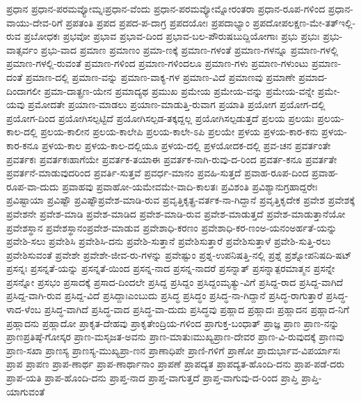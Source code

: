 {ಪ್ರಧಾನ
ಪ್ರಧಾನ-ಪರಮವ್ಯೋಮ್ನಃಪ್ರಧಾನ-ವೆಂದು
ಪ್ರಧಾನ-ಪರಮವ್ಯೋಮ್ನೋರಂತರಾ
ಪ್ರಧಾನ-ರೂಪ-ಗಳಿಂದ
ಪ್ರಧಾನ-ವಾಯು-ದೇವ-ರಿಗೆ
ಪ್ರಪತಂತಿ
ಪ್ರಪದ
ಪ್ರಪದ-ಪ-ದಾಗ್ರ
ಪ್ರಪದಯೋಃ
ಪ್ರಪದಾಭ್ಯಾಂ
ಪ್ರಪದೋಪಲಕ್ಷಣ-ಮೇ-ತತ್ಇಲ್ಲಿ-ರುವ
ಪ್ರಬೋಧಕಃ
ಪ್ರಭವೋ
ಪ್ರಭಾವ
ಪ್ರಭಾವ-ದಿಂದ
ಪ್ರಭಾವ-ಬಲ-ಪೌರುಷಬುದ್ದಿಯೋಗಾಃ
ಪ್ರಭು
ಪ್ರಭುಃ
ಪ್ರಭು-ವಾತ್ಸರ್ವಂ
ಪ್ರಭು-ವಾದ
ಪ್ರಮಾಣ
ಪ್ರಮಾಣಂ
ಪ್ರಮಾ-ಣಕ್ಕೆ
ಪ್ರಮಾಣ-ಗಳಂತೆ
ಪ್ರಮಾಣ-ಗಳನ್ನೂ
ಪ್ರಮಾಣ-ಗಳಲ್ಲಿ
ಪ್ರಮಾಣ-ಗಳಲ್ಲಿ-ರುವಂತೆ
ಪ್ರಮಾಣ-ಗಳಿಂದ
ಪ್ರಮಾಣ-ಗಳಿಂದಲೂ
ಪ್ರಮಾಣ-ಗಳು
ಪ್ರಮಾಣ-ಗಳುಂಟು
ಪ್ರಮಾಣ-ದಂತೆ
ಪ್ರಮಾಣ-ದಲ್ಲಿ
ಪ್ರಮಾಣ-ವನ್ನು
ಪ್ರಮಾಣ-ವಾಕ್ಯ-ಗಳ
ಪ್ರಮಾಣ-ವಿದೆ
ಪ್ರಮಾಣವು
ಪ್ರಮಾಣೇ
ಪ್ರಮಾದ-ದಿಂದಾಗಲೀ
ಪ್ರಮಾ-ದಾತ್ಪ್ರಣ-ಯೇನ
ಪ್ರಮಾದ್ಯಥ
ಪ್ರಮುಖ
ಪ್ರಮೇಯ
ಪ್ರಮೇಯ-ವನ್ನು
ಪ್ರಮೇಯ-ವನ್ನೇ
ಪ್ರಮೇ-ಯವು
ಪ್ರಮೋದತೇ
ಪ್ರಯಾಣ-ಮಾಡಲು
ಪ್ರಯಾಣ-ಮಾಡುತ್ತಿ-ರುವಾಗ
ಪ್ರಯಾತಿ
ಪ್ರಯೋಗ
ಪ್ರಯೋಗ-ದಲ್ಲಿ
ಪ್ರಯೋಗ-ದಿಂದ
ಪ್ರಯೋಗಿಸಲ್ಪಟ್ಟಿದೆ
ಪ್ರಯೋಗಿಸಲ್ಪಡ-ತಕ್ಕದ್ದಲ್ಲ
ಪ್ರಯೋಗಿಸಲ್ಪಡುತ್ತದೆ
ಪ್ರಲಯ
ಪ್ರಲಯಃ
ಪ್ರಲಯ-ಕಾಲ-ದಲ್ಲಿ
ಪ್ರಲಯ-ಕಾಲೀನ
ಪ್ರಲಯ-ಕಾಲೇಪಿ
ಪ್ರಲಯ-ಕಾಲೇ-ಽಪಿ
ಪ್ರಲಯೇ
ಪ್ರಳಯ
ಪ್ರಳಯ-ಕಾರ-ಕನು
ಪ್ರಳಯ-ಕಾರ-ಕನೂ
ಪ್ರಳಯ-ಕಾಲ
ಪ್ರಳಯ-ಕಾಲ-ದಲ್ಲಿಯೂ
ಪ್ರಳಯ-ದಲ್ಲಿ
ಪ್ರಳಯೋದಕ-ದಲ್ಲಿ
ಪ್ರವ-ಚನ
ಪ್ರವರ್ತಂತೇ
ಪ್ರವರ್ತಕಃ
ಪ್ರವರ್ತಕಃಹಾಗೆಯೇ
ಪ್ರವರ್ತಕ-ತಯಾಈ
ಪ್ರವರ್ತಕ-ನಾಗಿ-ರುವು-ದ-ರಿಂದ
ಪ್ರವರ್ತ-ಕನೂ
ಪ್ರವರ್ತತೇ
ಪ್ರವರ್ತನೆ-ಮಾಡುವುದರಿಂದ
ಪ್ರವರ್ತಿ-ಸುತ್ತವೆ
ಪ್ರವರ್ಧ-ಮಾನಂ
ಪ್ರವಹಿ-ಸುತ್ತದೆ
ಪ್ರವಾಹ-ರೂಪ-ದಿಂದ
ಪ್ರವಾಹ-ರೂಪ-ವಾ-ದುದು
ಪ್ರವಾಹವು
ಪ್ರವಾಹೋ-ಯಮೇವಮೇ-ವಾದಿ-ಕಾಲತಃ
ಪ್ರವಿಶಂತಿ
ಪ್ರವಿಶ್ಯಾನುಗ್ರಹಾದ್ದರೇಃ
ಪ್ರವಿಷ್ಟಾಯಾ
ಪ್ರವಿಷ್ಟೌ
ಪ್ರವಿಷ್ಟೌಪ್ರವೇಶ-ಮಾಡಿ-ರುವ
ಪ್ರವೃತ್ತಿಕೃತ್ಪ್ರ-ವರ್ತಕ-ನಾ-ಗಿದ್ದಾನೆ
ಪ್ರವೃತ್ತಿಕೃದೇಕ
ಪ್ರವೇಶ
ಪ್ರವೇಶಕ್ಕೆ
ಪ್ರವೇಶನೇ
ಪ್ರವೇಶ-ಮಾಡಿ
ಪ್ರವೇಶ-ಮಾಡಿದ
ಪ್ರವೇಶ-ಮಾಡಿ-ರುವ
ಪ್ರವೇಶ-ಮಾಡುತ್ತದೆ
ಪ್ರವೇಶ-ಮಾಡುತ್ತಾನೆಯೋ
ಪ್ರವೇಶಸ್ಥಾನ
ಪ್ರವೇಶಸ್ಥಾನಂಪ್ರವೇಶ-ಮಾಡುವ
ಪ್ರವೇಶಾಧಿ-ಕರಣಂ
ಪ್ರವೇಶಾಧಿ-ಕರ-ಣಂಅ-ಯನಂಅರ್ಹತೆ-ಯನ್ನು
ಪ್ರವೇಶಿ-ಸಲು
ಪ್ರವೇಶಿಸಿ
ಪ್ರವೇಶಿಸಿ-ದನು
ಪ್ರವೇಶಿ-ಸುತ್ತಾನೆ
ಪ್ರವೇಶಿಸುತ್ತಾರೆ
ಪ್ರವೇಶಿಸುತ್ತಾಳೆ
ಪ್ರವೇಶಿ-ಸುತ್ತಿ-ರಲು
ಪ್ರವೇಶಿಸುವಂತೆ
ಪ್ರವೇಶೇ
ಪ್ರವೇಶೇ-ಜೀವ-ರು-ಗಳನ್ನು
ಪ್ರವೇಷ್ಟುಂ
ಪ್ರಶ್ನ-ಉಪನಿಷತ್ತಿ-ನಲ್ಲಿ
ಪ್ರಶ್ನೆ
ಪ್ರಶ್ನೋಪನಿಷದಿ-ಷಟ್
ಪ್ರಸನ್ನಃ
ಪ್ರಸನ್ನತೆ-ಯನ್ನು
ಪ್ರಸನ್ನತೆ-ಯಿಂದ
ಪ್ರಸನ್ನ-ನಾದ
ಪ್ರಸನ್ನ-ನಾದರೆ
ಪ್ರಸನ್ನಾತ್
ಪ್ರಸನ್ನಾತ್ಪರಮಾತ್ಮನ
ಪ್ರಸನ್ನೇ
ಪ್ರಸನ್ನೋ
ಪ್ರಸಭಂ
ಪ್ರಸಾದಕ್ಕೆ
ಪ್ರಸಾದ-ದಿಂದಲೇ
ಪ್ರಸಿದ್ದ
ಪ್ರಸಿದ್ದಂ
ಪ್ರಸಿದ್ದಂಮೃತ್ಯು-ವಿಗೆ
ಪ್ರಸಿದ್ದ-ರಾದ
ಪ್ರಸಿದ್ದ-ವಾಗಿದೆ
ಪ್ರಸಿದ್ದ-ವಾಗಿ-ರುವ
ಪ್ರಸಿದ್ದ-ವಿದೆ
ಪ್ರಸಿದ್ದಾಃಎಂಬುದು
ಪ್ರಸಿದ್ಧ
ಪ್ರಸಿದ್ಧಂ
ಪ್ರಸಿದ್ಧ-ನಾ-ಗಿದ್ದಾನೆ
ಪ್ರಸಿದ್ಧ-ರಾಗುತ್ತಾರೆ
ಪ್ರಸಿದ್ಧ-ಳಾದ-ಳೆಂಬ
ಪ್ರಸಿದ್ಧ-ವಾಗಿದೆ
ಪ್ರಸಿದ್ಧ-ವಾದ
ಪ್ರಸಿದ್ಧ-ವಾ-ದುದು
ಪ್ರಸಿದ್ಧವು
ಪ್ರಹ್ಲಾದ
ಪ್ರಹ್ಲಾದಃ
ಪ್ರಹ್ಲಾದನ
ಪ್ರಹ್ಲಾದ-ನಿಗೆ
ಪ್ರಹ್ಲಾದನು
ಪ್ರಹ್ಲಾದೋ
ಪ್ರಾಕೃತ-ದೇಹವು
ಪ್ರಾಕೃತೇಂದ್ರಿಯ-ಗಳಿಂದ
ಪ್ರಾಗುಕ್ತ-ಬಂಧಾತ್
ಪ್ರಾಜ್ಞ
ಪ್ರಾಣ
ಪ್ರಾಣ-ನನ್ನು
ಪ್ರಾಣಪ್ರತಿಷ್ಠೆ-ಗೋಸ್ಕರ
ಪ್ರಾಣ-ಮಸೃಜತ-ಅವನು
ಪ್ರಾಣ-ಮಾತುಃಮುಖ್ಯಪ್ರಾಣ-ದೇವರ
ಪ್ರಾಣ-ವಿ-ರುವುದಕ್ಕೆ
ಪ್ರಾಣವು
ಪ್ರಾಣ-ಸಖಾ
ಪ್ರಾಣಸ್ಯ
ಪ್ರಾಣಸ್ಯ-ಮುಖ್ಯಪ್ರಾ-ಣನ
ಪ್ರಾಣಾಧಿಪೇ
ಪ್ರಾಣಿ-ಗಳಿಗೆ
ಪ್ರಾಣೋ
ಪ್ರಾದುರ್ಭಾವ-ವಿಪರ್ಯಾಸಃ
ಪ್ರಾಪ
ಪ್ರಾಪಣ
ಪ್ರಾಪ-ಣಾರ್ಥ
ಪ್ರಾಪ-ಣಾರ್ಥಾನಾಂ
ಪ್ರಾಪಣೆ
ಪ್ರಾಪದ್ಯತ
ಪ್ರಾಪದ್ಯತ-ಹೊಂದಿ-ದನು
ಪ್ರಾಪ-ಪಡೆ-ದರು
ಪ್ರಾಪ-ಯತಿ
ಪ್ರಾಪ-ಹೊಂದಿ-ದನು
ಪ್ರಾಪ್ತ-ನಾದ
ಪ್ರಾಪ್ತ-ವಾಗುತ್ತದೆ
ಪ್ರಾಪ್ತ-ವಾಗುವು-ದ-ರಿಂದ
ಪ್ರಾಪ್ತಿ
ಪ್ರಾಪ್ತಿ-ಯಾಗುವಂತೆ
}
